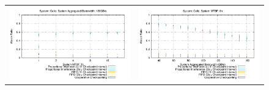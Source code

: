 \documentclass[conference]{IEEEtran}
\begin{document}
\begin{figure}[t]
\begin{tabular}{C{.5\linewidth}C{.5\linewidth}}
\includegraphics[width=\linewidth]{sim/figures/synthetic-120gbs-waste-celio.pdf} & \includegraphics[width=\linewidth]{sim/figures/synthetic-08hMTBF-waste-celio.pdf} \\

\end{tabular}
\end{figure}
\end{document}
